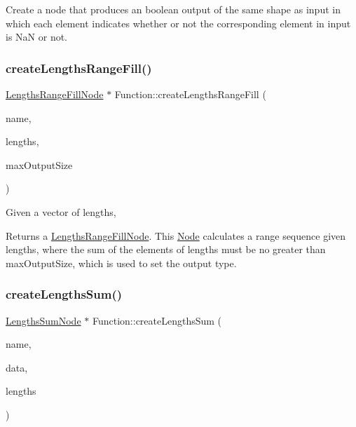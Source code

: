 Create a node that produces an boolean output of the same shape as {\ttfamily input} in which each element indicates whether or not the corresponding element in {\ttfamily input} is NaN or not. \mbox{\label{classglow_1_1_function_a0e83d1e9da4a42527cc13d24ac29c17b}} 
\subsubsection{\texorpdfstring{create\+Lengths\+Range\+Fill()}{createLengthsRangeFill()}}
{\footnotesize\ttfamily \hyperlink{classglow_1_1_lengths_range_fill_node}{Lengths\+Range\+Fill\+Node} $\ast$ Function\+::create\+Lengths\+Range\+Fill (\begin{DoxyParamCaption}\item[{llvm\+::\+String\+Ref}]{name,  }\item[{\hyperlink{structglow_1_1_node_value}{Node\+Value}}]{lengths,  }\item[{\hyperlink{namespaceglow_a0ca574644e1e42ef193a9947fb4d8911}{unsigned\+\_\+t}}]{max\+Output\+Size }\end{DoxyParamCaption})}

Given a vector of {\ttfamily lengths}, \begin{DoxyReturn}{Returns}
a \hyperlink{classglow_1_1_lengths_range_fill_node}{Lengths\+Range\+Fill\+Node}. This \hyperlink{classglow_1_1_node}{Node} calculates a range sequence given {\ttfamily lengths}, where the sum of the elements of {\ttfamily lengths} must be no greater than {\ttfamily max\+Output\+Size}, which is used to set the output type. 
\end{DoxyReturn}
\mbox{\label{classglow_1_1_function_a24bdca6a0b3ac6ba120f98b28440e2bc}} 
\subsubsection{\texorpdfstring{create\+Lengths\+Sum()}{createLengthsSum()}}
{\footnotesize\ttfamily \hyperlink{classglow_1_1_lengths_sum_node}{Lengths\+Sum\+Node} $\ast$ Function\+::create\+Lengths\+Sum (\begin{DoxyParamCaption}\item[{llvm\+::\+String\+Ref}]{name,  }\item[{\hyperlink{structglow_1_1_node_value}{Node\+Value}}]{data,  }\item[{\hyperlink{structglow_1_1_node_value}{Node\+Value}}]{lengths }\end{DoxyParamCaption})}

